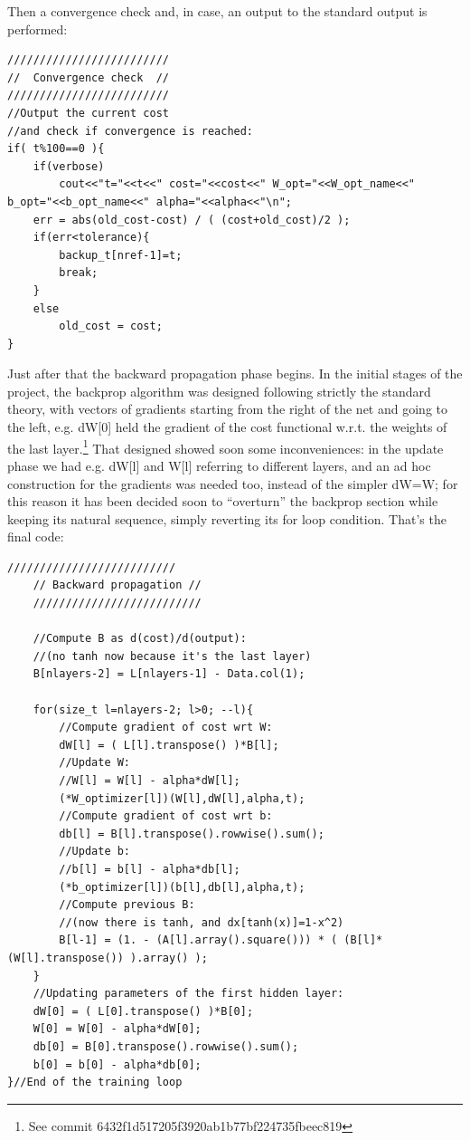\documentclass[12pt, a4paper]{report}
\theoremstyle{definition}
\begin{document}
Then a convergence check and, in case, an output to the standard output is performed:
\begin{lstlisting}[frame=single, showstringspaces=false]
/////////////////////////
//  Convergence check  //
/////////////////////////
//Output the current cost
//and check if convergence is reached:
if( t%100==0 ){
	if(verbose)
		cout<<"t="<<t<<" cost="<<cost<<" W_opt="<<W_opt_name<<" b_opt="<<b_opt_name<<" alpha="<<alpha<<"\n";
	err = abs(old_cost-cost) / ( (cost+old_cost)/2 );
	if(err<tolerance){
		backup_t[nref-1]=t;
		break;
	}
	else
		old_cost = cost;
}
\end{lstlisting}
Just after that the backward propagation phase begins. In the initial stages of the project, the backprop algorithm was designed following strictly the standard theory, with vectors of gradients starting from the right of the net and going to the left, e.g. {\ttfamily dW[0]} held the gradient of the cost functional w.r.t. the weights of the last layer.\footnote{See commit 6432f1d517205f3920ab1b77bf224735fbeec819} That designed showed soon some inconveniences: in the update phase we had e.g. {\ttfamily dW[l]} and {\ttfamily W[l]} referring to different layers, and an ad hoc construction for the gradients was needed too, instead of the simpler {\ttfamily dW=W}; for this reason it has been decided soon to ``overturn'' the backprop section while keeping its natural sequence, simply reverting its for loop condition. That's the final code:
\begin{lstlisting}[frame=single]
	//////////////////////////
	// Backward propagation //
	//////////////////////////
	
	//Compute B as d(cost)/d(output): 
	//(no tanh now because it's the last layer)
	B[nlayers-2] = L[nlayers-1] - Data.col(1);	

	for(size_t l=nlayers-2; l>0; --l){
		//Compute gradient of cost wrt W:
		dW[l] = ( L[l].transpose() )*B[l];
		//Update W:
		//W[l] = W[l] - alpha*dW[l];
		(*W_optimizer[l])(W[l],dW[l],alpha,t);
		//Compute gradient of cost wrt b:
		db[l] = B[l].transpose().rowwise().sum();
		//Update b:
		//b[l] = b[l] - alpha*db[l];
		(*b_optimizer[l])(b[l],db[l],alpha,t);
		//Compute previous B: 
		//(now there is tanh, and dx[tanh(x)]=1-x^2)
		B[l-1] = (1. - (A[l].array().square())) * ( (B[l]* (W[l].transpose()) ).array() );
	}
	//Updating parameters of the first hidden layer:
	dW[0] = ( L[0].transpose() )*B[0];
	W[0] = W[0] - alpha*dW[0];
	db[0] = B[0].transpose().rowwise().sum();
	b[0] = b[0] - alpha*db[0];
}//End of the training loop
\end{lstlisting}
\end{document}
